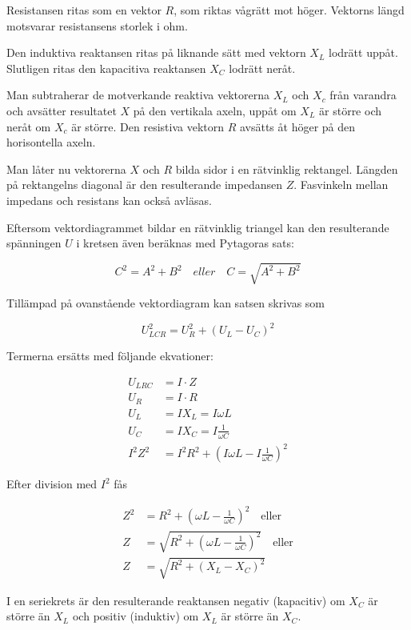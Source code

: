 Resistansen ritas som en vektor \(R\), som riktas vågrätt mot höger.
Vektorns längd motsvarar resistansens storlek i ohm.

Den induktiva reaktansen ritas på liknande sätt med vektorn \(X_L\) lodrätt
uppåt.
Slutligen ritas den kapacitiva reaktansen \(X_C\) lodrätt neråt.

Man subtraherar de motverkande reaktiva vektorerna \(X_L\) och \(X_c\) från
varandra och avsätter resultatet \(X\) på den vertikala axeln, uppåt om \(X_L\)
är större och neråt om \(X_c\) är större.
Den resistiva vektorn \(R\) avsätts åt höger på den horisontella axeln.

Man låter nu vektorerna \(X\) och \(R\) bilda sidor i en rätvinklig rektangel.
Längden på rektangelns diagonal är den resulterande impedansen \(Z\).
Fasvinkeln mellan impedans och resistans kan också avläsas.

Eftersom vektordiagrammet bildar en rätvinklig triangel kan den resulterande
spänningen \(U\) i kretsen även beräknas med Pytagoras sats:

\[C^2 = A^2 + B^2 \quad eller \quad C = \sqrt{A^2 + B^2}\]

Tillämpad på ovanstående vektordiagram kan satsen skrivas som

\[U_{LCR}^2 = U_R^2 + ( U_L - U_C)^2\]

Termerna ersätts med följande ekvationer:

\begin{align*}
  U_{LRC} &= I \cdot Z \\
  U_R &= I \cdot R \\
  U_L &= I X_L = I \omega L \\
  U_C &= I X_C = I \frac{1}{\omega C} \\
  I^2 Z^2 &= I^2 R^2 + ( I \omega L - I\frac{1}{\omega C})^2
\end{align*}

Efter division med \(I^2\) fås

\begin{align*}
  Z^2 &= R^2 + ( \omega L - \frac{1}{\omega C} )^2 \quad \text{eller} \\
  Z &= \sqrt{R^2 + (\omega L - \frac{1}{\omega C})^2} \quad \text{eller} \\
  Z &= \sqrt{R^2 + (X_L - X_C)^2}
\end{align*}

I en seriekrets är den resulterande reaktansen negativ (kapacitiv) om \(X_C\) är
större än \(X_L\) och positiv (induktiv) om \(X_L\) är större än \(X_C\).

